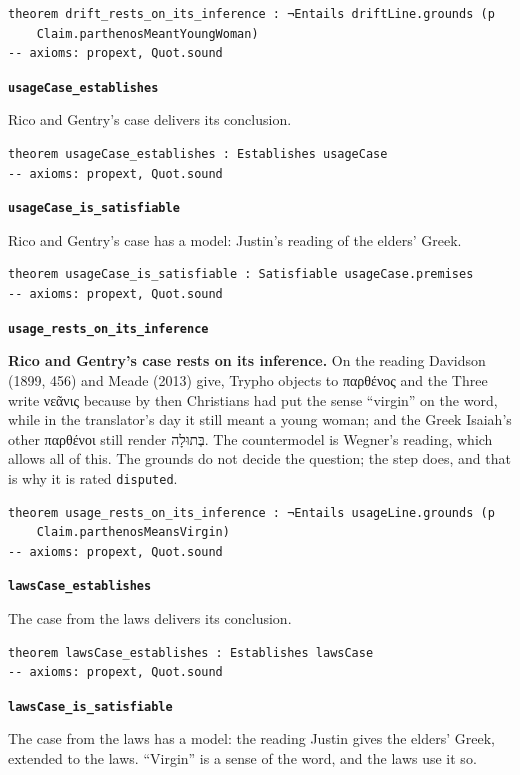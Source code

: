 \documentclass[11pt]{article}
\begin{document}
{\small\begin{verbatim}
theorem drift_rests_on_its_inference : ¬Entails driftLine.grounds (p
    Claim.parthenosMeantYoungWoman)
-- axioms: propext, Quot.sound
\end{verbatim}}
\par\medskip\noindent\textbf{\texttt{usage\allowbreak{}Case\_\allowbreak{}establishes}}\par\nobreak\noindent
Rico and Gentry’s case delivers its conclusion.

{\small\begin{verbatim}
theorem usageCase_establishes : Establishes usageCase
-- axioms: propext, Quot.sound
\end{verbatim}}
\par\medskip\noindent\textbf{\texttt{usage\allowbreak{}Case\_\allowbreak{}is\_\allowbreak{}satisfiable}}\par\nobreak\noindent
Rico and Gentry’s case has a model: Justin’s reading of the elders’ Greek.

{\small\begin{verbatim}
theorem usageCase_is_satisfiable : Satisfiable usageCase.premises
-- axioms: propext, Quot.sound
\end{verbatim}}
\par\medskip\noindent\textbf{\texttt{usage\_\allowbreak{}rests\_\allowbreak{}on\_\allowbreak{}its\_\allowbreak{}inference}}\par\nobreak\noindent
\textbf{Rico and Gentry’s case rests on its inference.} On the reading Davidson (1899, 456) and Meade (2013) give, Trypho objects to παρθένος and the Three write νεᾶνις because by then Christians had put the sense “virgin” on the word, while in the translator’s day it still meant a young woman; and the Greek Isaiah’s other παρθένοι still render בְּתוּלָה. The countermodel is Wegner’s reading, which allows all of this. The grounds do not decide the question; the step does, and that is why it is rated \texttt{disputed}.

{\small\begin{verbatim}
theorem usage_rests_on_its_inference : ¬Entails usageLine.grounds (p
    Claim.parthenosMeansVirgin)
-- axioms: propext, Quot.sound
\end{verbatim}}
\par\medskip\noindent\textbf{\texttt{laws\allowbreak{}Case\_\allowbreak{}establishes}}\par\nobreak\noindent
The case from the laws delivers its conclusion.

{\small\begin{verbatim}
theorem lawsCase_establishes : Establishes lawsCase
-- axioms: propext, Quot.sound
\end{verbatim}}
\par\medskip\noindent\textbf{\texttt{laws\allowbreak{}Case\_\allowbreak{}is\_\allowbreak{}satisfiable}}\par\nobreak\noindent
The case from the laws has a model: the reading Justin gives the elders’ Greek, extended to the laws. “Virgin” is a sense of the word, and the laws use it so.
\end{document}

